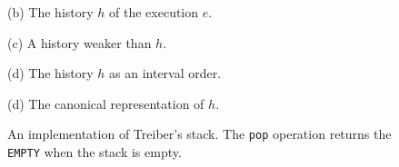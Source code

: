 \begin{figure*}[t]
\begin{minipage}[c]{130mm}
\begin{minipage}[c]{7cm}
    \centering
    \vspace{4mm}
    (b) The history $h$ of the execution $e$.
    \end{minipage}
    \begin{minipage}[c]{4cm}
    \centering
    

    \centering
    (c) A history weaker than $h$.
    \end{minipage}

     \bigskip
     \centering
    
    
    \smallskip
    (d) The history $h$ as an interval order.

    
     \bigskip
     \centering
    
    
    \smallskip
    (d) The canonical representation of $h$.
    
%    
%    
        
%    
    
  \end{minipage}
  \caption{An implementation of Treiber's stack. The {\tt pop} operation
  returns the {\tt EMPTY} when the stack is empty.}
  \label{fig:stacks}
\end{figure*}

